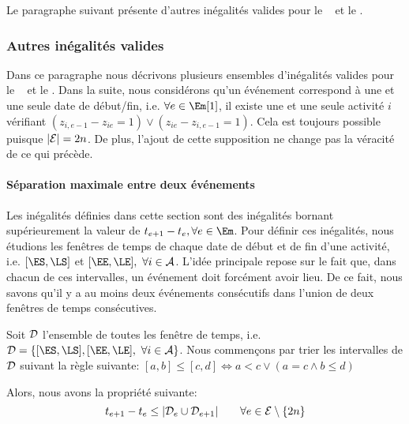 Le paragraphe suivant présente d'autres inégalités valides pour le
\CECSP~ et le \RCPSP. 

\subsubsection{Autres inégalités valides}

Dans ce paragraphe nous décrivons plusieurs ensembles d'inégalités
valides pour le \RCPSP~ et le \CECSP. Dans la suite, nous considérons
qu'un événement correspond à une et une seule date de début/fin,
i.e. $\forall e \in \Em[1]$, il existe une et une seule activité $i$
vérifiant $(z_{i,e-1}-z_{ie}=1) \vee (z_{ie}-z_{i,e-1}=1)$. Cela est
toujours possible puisque $|{\cal E}|=2n$. De plus, l'ajout de cette
supposition ne change pas la véracité de ce qui précède. 

\paragraph{Séparation maximale entre deux événements} 

Les inégalités définies dans cette section sont des inégalités bornant
supérieurement la valeur de $t_{e+1}- t_e, \forall e\in \Em$. Pour
définir ces inégalités, nous étudions les fenêtres de temps de chaque
date de début et de fin d'une activité, i.e. $[\ES,\LS]$ et
$[\EE,\LE],\ \forall i \in \A$. L'idée principale repose sur le fait
que, dans chacun de ces intervalles, un événement doit forcément avoir
lieu. De ce fait, nous savons qu'il y a au moins deux événements
consécutifs dans l'union de deux fenêtres de temps consécutives. 

Soit ${\cal D}$ l'ensemble de toutes les fenêtre de temps, i.e. ${\cal
D}=\{[\ES,\LS] , [\EE,\LE],\ \forall i \in \A\}$. Nous commençons par
trier les intervalles de $\cal D$ suivant la règle suivante: 
$[a,b] \le [c,d]
\Leftrightarrow a<c \lor \left( a=c \land b\le d\right)$

Alors, nous avons la propriété suivante:
\begin{equation} \label{sep_CECSP_OO} 
t_{e+1}-t_e \le |{\cal D}_e \cup
{\cal D}_{e+1}| \qquad \forall e \in {\cal E}\setminus\{2n\}
\end{equation}


